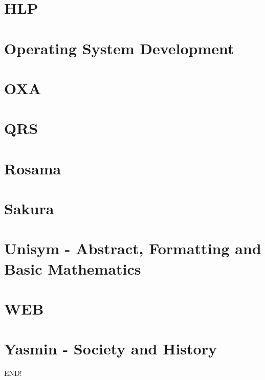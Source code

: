 \documentclass[a4paper,12pt,UTF8]{book}
\begin{document}
\chapter{HLP}


\chapter{Operating System Development}


\chapter{OXA}


\chapter{QRS}


\chapter{Rosama}


\chapter{Sakura}


\chapter{Unisym \mbox{-} Abstract, Formatting and Basic Mathematics}


\chapter{WEB}


\chapter{Yasmin \mbox{-} Society and History}


\newpage
END!
\end{document}
